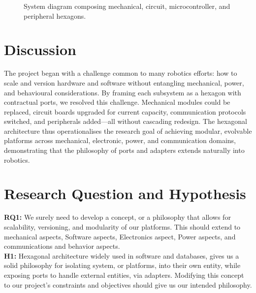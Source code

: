 \begin{figure}[H]
  \centering
  \fbox{\rule{0pt}{2in} \rule{3in}{0pt}}
  \caption{System diagram composing mechanical, circuit, microcontroller, and peripheral hexagons.}
  \label{fig:system_composition}
\end{figure}

\section{Discussion}
The project began with a challenge common to many robotics efforts: how to scale and version hardware and software without
entangling mechanical, power, and behavioural considerations. By framing each subsystem as a hexagon with contractual ports, we
resolved this challenge. Mechanical modules could be replaced, circuit boards upgraded for current capacity, communication
protocols switched, and peripherals added—all without cascading redesign. The hexagonal architecture thus operationalises the
research goal of achieving modular, evolvable platforms across mechanical, electronic, power, and communication domains,
demonstrating that the philosophy of ports and adapters extends naturally into robotics.

\section*{Research Question and Hypothesis}
\textbf{RQ1:} We surely need to develop a concept, or a philosophy that allows for scalability, versioning, and modularity of our platforms. This should extend to mechanical aspects, Software aspects, Electronics aspect, Power aspects, and communications and behavior aspects.\\
\textbf{H1:} Hexagonal architecture widely used in software and databases, gives us a solid philosophy for isolating system, or platforms, into their own entity, while exposing ports to handle external entities, via adapters. Modifying this concept to our project's constraints and objectives should give us our intended philosophy.

